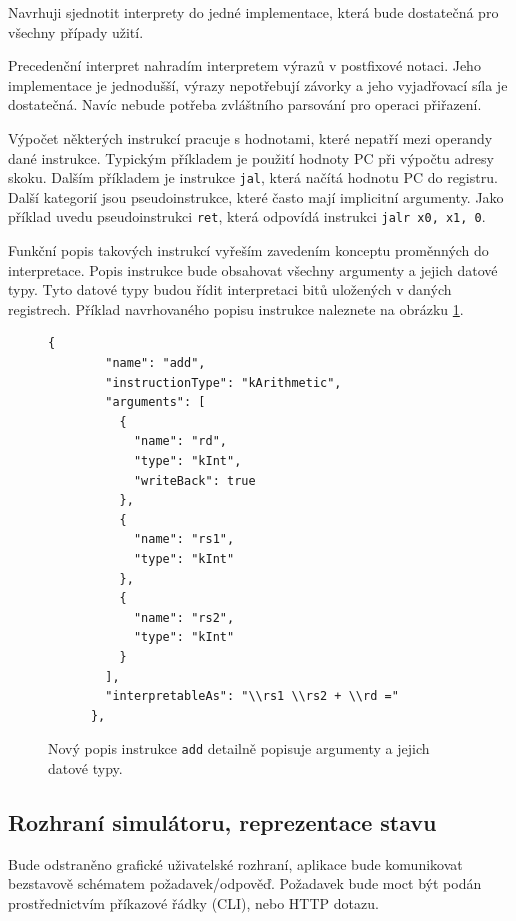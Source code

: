 Navrhuji sjednotit interprety do jedné implementace, která bude dostatečná pro všechny případy užití.

Precedenční interpret nahradím interpretem výrazů v postfixové notaci. Jeho implementace je jednodušší, výrazy nepotřebují závorky a jeho vyjadřovací síla je dostatečná.
Navíc nebude potřeba zvláštního parsování pro operaci přiřazení.

Výpočet některých instrukcí pracuje s hodnotami, které nepatří mezi operandy dané instrukce. Typickým příkladem je použití hodnoty PC při výpočtu adresy skoku. Dalším příkladem je instrukce \texttt{jal}, která načítá hodnotu PC do registru. Další kategorií jsou pseudoinstrukce, které často mají implicitní argumenty. Jako příklad uvedu pseudoinstrukci \texttt{ret}, která odpovídá instrukci \texttt{jalr x0, x1, 0}.

Funkční popis takových instrukcí vyřeším zavedením konceptu proměnných do interpretace. Popis instrukce bude obsahovat všechny argumenty a jejich datové typy. Tyto datové typy budou řídit interpretaci bitů uložených v daných registrech.
Příklad navrhovaného popisu instrukce naleznete na obrázku \ref{code2}.

\begin{figure}[hbtp]
    \begin{lstlisting}[]
       {
        "name": "add",
        "instructionType": "kArithmetic",
        "arguments": [
          {
            "name": "rd",
            "type": "kInt",
            "writeBack": true
          },
          {
            "name": "rs1",
            "type": "kInt"
          },
          {
            "name": "rs2",
            "type": "kInt"
          }
        ],
        "interpretableAs": "\\rs1 \\rs2 + \\rd ="
      },
    \end{lstlisting}
    \caption{Nový popis instrukce \texttt{add} detailně popisuje argumenty a jejich datové typy.}
    \label{code2}
\end{figure}



\subsection{Rozhraní simulátoru, reprezentace stavu}

Bude odstraněno grafické uživatelské rozhraní, aplikace bude komunikovat bezstavově schématem požadavek/odpověď.
Požadavek bude moct být podán prostřednictvím příkazové řádky (CLI), nebo HTTP dotazu.

